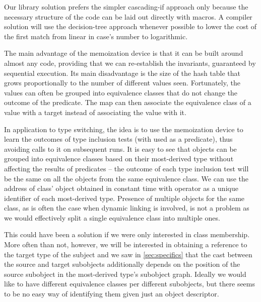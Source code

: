 \noindent
Our library solution prefers the simpler cascading-if approach only because the necessary 
structure of the code can be laid out directly with macros. A compiler solution 
will use the decision-tree approach whenever possible to lower the cost of the 
first match from linear in case's number to logarithmic. %


The main advantage of the memoization device is that it can be built around 
almost any code, providing that we can re-establish the invariants, guaranteed 
by sequential execution. Its main disadvantage is the size of the hash table 
that grows proportionally to the number of different values seen. Fortunately, 
the values can often be grouped into equivalence classes that do not change the 
outcome of the predicate. The map can then associate the equivalence class of a 
value with a target instead of associating the value with it. 

In application to type switching, the idea is to use the memoization device to 
learn the outcomes of type inclusion tests (with  used as a predicate), 
thus avoiding calls to it on subsequent runs. It is easy to see that objects can 
be grouped into equivalence classes based on their most-derived type without 
affecting the results of predicates -- the outcome of each type inclusion test will be the 
same on all the objects from the same equivalence class. We can use the 
address of class'  object obtained in constant time with 
 operator as a unique identifier of each most-derived type. 
Presence of multiple  objects for the same class, as is often 
the case when dynamic linking is involved, is not a problem as we would 
effectively split a single equivalence class into multiple ones. 

This could have been a solution if we were only interested in class membership. 
More often than not, however, we will be interested in obtaining a reference to 
the target type of the subject and we saw in \textsection\ref{sec:specifics} 
that the cast between the source and target subobjects additionally depends on 
the position of the source subobject in the most-derived type's subobject graph. 
Ideally we would like to have different equivalence classes per different 
subobjects, but there seems to be no easy way of identifying them given just an 
object descriptor.

